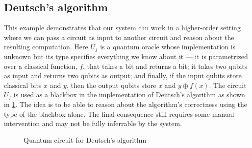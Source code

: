 \documentclass[adraft,creativecommons]{eptcs}
\begin{document}
\subsection{Deutsch's algorithm}
This example demonstrates that our system can work in a higher-order setting where we can pass a circuit as input to another circuit and reason about the resulting computation. Here $U_f$ is a quantum oracle whose implementation is unknown but its type specifies everything we know about it --- it is parametrized over a classical function, $f$, that takes a bit and returns a bit; it takes two qubits as input and returns two qubits as output; and finally, if the input qubits store classical bits $x$ and $y$, then the output qubits store $x$ and $y \oplus f(x)$. The circuit $U_f$ is used as a blackbox in the implementation of Deutsch's algorithm as shown in \cref{fig:deutsch}. The idea is to be able to reason about the algorithm's correctness using the type of the blackbox alone. The final consequence still requires some manual intervention and may not be fully inferrable by the system.

\begin{figure}
    \centering
    \caption{Quantum circuit for Deutsch's algorithm}
    \label{fig:deutsch}
\end{figure}




% 
\end{document}
